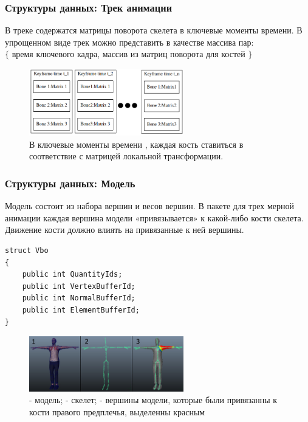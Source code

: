 \documentclass{beamer}
\newcommand{\Code}[1]{\detokenize{#1}}
\begin{document}
  
\begin{frame}
\frametitle{Структуры данных: Трек анимации}
\begin{small}
В треке содержатся матрицы поворота скелета в ключевые моменты времени.
В упрощенном виде трек можно представить в качестве  массива пар: \\
$\lbrace$ время ключевого кадра, массив из матриц поворота для костей $\rbrace$

\begin{figure}[h!]
    \centering
    \includegraphics[width=0.6\textwidth]{anim_track.png}
    \caption{\scriptsize{В ключевые моменты времени \Code{(t_1, t_2, ... t_n)}, каждая кость ставиться в соответствие с матрицей локальной трансформации.}}    
\end{figure}


\end{small}
\end{frame}


  
\begin{frame}[fragile]
\frametitle{Структуры данных: Модель}
\begin{scriptsize}

\begin{multicols}{2}
Модель состоит из набора вершин и весов вершин. В пакете для трех мерной анимации каждая вершина модели «привязывается» к какой-либо кости скелета. Движение кости должно влиять на привязанные к ней вершины.

\columnbreak

\begin{verbatim}
struct Vbo
{
    public int QuantityIds;    
    public int VertexBufferId;
    public int NormalBufferId;
    public int ElementBufferId;
}
\end{verbatim}

\end{multicols}

\begin{figure}[h!]
    \centering
    \includegraphics[width=0.6\textwidth]{skinning.png}
    \caption{\scriptsize{ - модель;  - скелет;  - вершины модели, которые были привязанны к кости правого предплечья, выделенны красным}}
\end{figure}

\end{scriptsize}
\end{frame}
\end{document}
